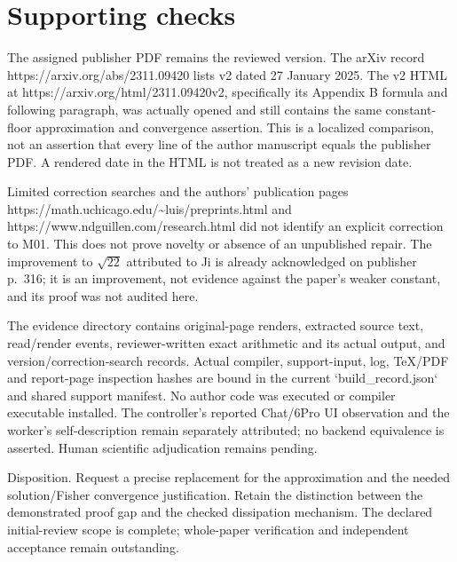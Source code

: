 \documentclass[10pt]{article}
\begin{document}
\section*{Supporting checks}
The assigned publisher PDF remains the reviewed version. The arXiv record https://arxiv.org/abs/2311.09420 lists v2 dated 27 January 2025. The v2 HTML at https://arxiv.org/html/2311.09420v2, specifically its Appendix B formula and following paragraph, was actually opened and still contains the same constant-floor approximation and convergence assertion. This is a localized comparison, not an assertion that every line of the author manuscript equals the publisher PDF. A rendered date in the HTML is not treated as a new revision date.\par
Limited correction searches and the authors’ publication pages https://math.uchicago.edu/\textasciitilde{}luis/preprints.html and https://www.ndguillen.com/research.html did not identify an explicit correction to M01. This does not prove novelty or absence of an unpublished repair. The improvement to \(\sqrt{22}\) attributed to Ji is already acknowledged on publisher p. 316; it is an improvement, not evidence against the paper’s weaker constant, and its proof was not audited here.\par
The evidence directory contains original-page renders, extracted source text, read/render events, reviewer-written exact arithmetic and its actual output, and version/correction-search records. Actual compiler, support-input, log, TeX/PDF and report-page inspection hashes are bound in the current `build\_record.json` and shared support manifest. No author code was executed or compiler executable installed. The controller’s reported Chat/6Pro UI observation and the worker’s self-description remain separately attributed; no backend equivalence is asserted. Human scientific adjudication remains pending.\par
Disposition. Request a precise replacement for the approximation and the needed solution/Fisher convergence justification. Retain the distinction between the demonstrated proof gap and the checked dissipation mechanism. The declared initial-review scope is complete; whole-paper verification and independent acceptance remain outstanding.\par
\end{document}
